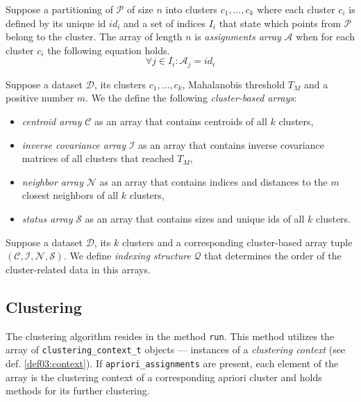 \begin{defn}
	Suppose a partitioning of $\mathcal{P}$ of size $n$ into clusters $c_1,\dots,c_k$ where each cluster $c_i$ is defined by its unique id $id_i$ and a set of indices $I_i$ that state which points from $\mathcal{P}$ belong to the cluster. The array of length $n$ is \emph{assignments array} $\mathcal{A}$ when for each cluster $c_i$ the following equation holds.
	$${\forall j \in I_i : \mathcal{A}_j = id_i}$$
	\label{def03:assign}
\end{defn}

\begin{defn}
	Suppose a dataset $\mathcal{D}$, its clusters $c_1,\dots,c_k$,  Mahalanobis threshold $T_M$ and a positive number $m$. We the define the following \emph{cluster-based arrays}:
	\begin{itemize}
		\item \emph{centroid array} $\mathcal{C}$ as an array that contains centroids of all $k$ clusters,
		\item \emph{inverse covariance array} $\mathcal{I}$ as an array that contains inverse covariance matrices of all clusters that reached $T_M$,
		\item \emph{neighbor array} $\mathcal{N}$ as an array that contains indices and distances to the $m$ closest neighbors of all $k$ clusters,
		\item \emph{status array} $\mathcal{S}$ as an array that contains sizes and unique ids of all $k$ clusters.
	\end{itemize}
	\label{def03:tuple}
\end{defn}

\begin{defn}
	Suppose a dataset $\mathcal{D}$, its $k$ clusters and a corresponding cluster-based array tuple $(\mathcal{C},\mathcal{I},\mathcal{N},\mathcal{S})$. We define \emph{indexing structure} $\mathcal{Q}$ that determines the order of the cluster-related data in this arrays.
	\label{def03:index}
\end{defn}

\subsection{Clustering}
The clustering algorithm resides in the method \texttt{run}. This method utilizes the array of \texttt{clustering\_context\_t} objects --- instances of a \emph{clustering context} (see def. \ref{def03:context}). If \texttt{apriori\_assignments} are present, each element of the array is the clustering context of a corresponding apriori cluster and holds methods for its further clustering. 

